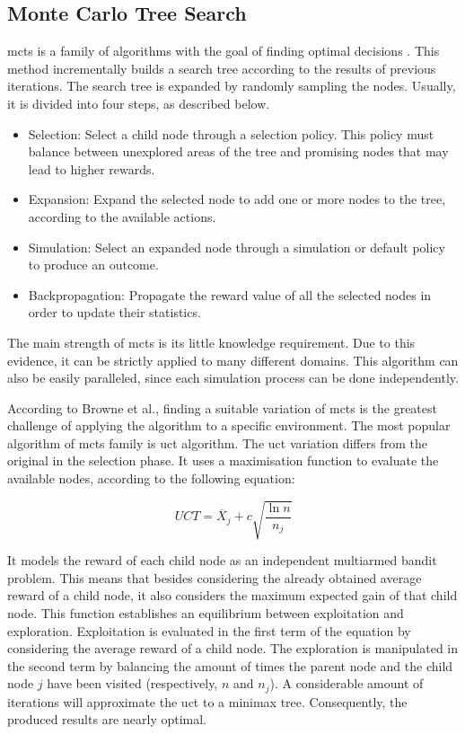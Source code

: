 \subsection{Monte Carlo Tree Search}


\gls{mcts} is a family of algorithms with the goal of finding optimal decisions \cite{Browne2012}.
This method incrementally builds a search tree according to the results of previous iterations.
The search tree is expanded by randomly sampling the nodes.
Usually, it is divided into four steps, as described below.
\begin{itemize}
  \item Selection: Select a child node through a selection policy. This policy must balance between unexplored areas of the tree and promising nodes that may lead to higher rewards.
  \item Expansion: Expand the selected node to add one or more nodes to the tree, according to the available actions.
  \item Simulation: Select an expanded node through a simulation or default policy to produce an outcome.
  \item Backpropagation: Propagate the reward value of all the selected nodes in order to update their statistics.
\end{itemize}


The main strength of \gls{mcts} is its little knowledge requirement.
Due to this evidence, it can be strictly applied to many different domains.
This algorithm can also be easily paralleled, since each simulation process can be done independently.


According to Browne et al., finding a suitable variation of \gls{mcts} is the greatest challenge of applying the algorithm to a specific environment.
The most popular algorithm of \gls{mcts} family is \gls{uct} algorithm.
The \gls{uct} variation differs from the original in the selection phase.
It uses a maximisation function to evaluate the available nodes, according to the following equation:

\begin{equation}
    UCT = \overline{X}_j + c\sqrt{\frac{\ln n}{n_j}}
\end{equation}

It models the reward of each child node as an independent multiarmed bandit problem.
This means that besides considering the already obtained average reward of a child node, it also considers the maximum expected gain of that child node.
This function establishes an equilibrium between exploitation and exploration.
Exploitation is evaluated in the first term of the equation by considering the average reward of a child node.
The exploration is manipulated in the second term by balancing the amount of times the parent node and the child node $j$ have been visited (respectively, $n$ and $n_j$).
A considerable amount of iterations will approximate the \gls{uct} to a minimax tree.
Consequently, the produced results are nearly optimal.

 
